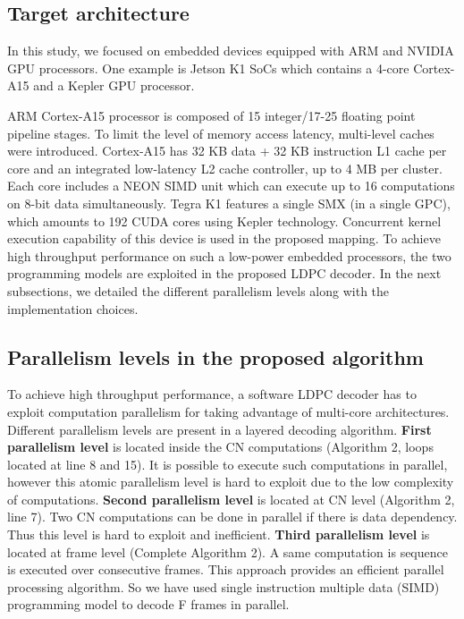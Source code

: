 \documentclass[conference]{IEEEtran}
\begin{document}
\subsection{Target architecture} \label{target_architecture}
In this study, we focused on embedded devices equipped with ARM and NVIDIA GPU processors. One example is Jetson K1 SoCs which contains a 4-core Cortex-A15 and a Kepler GPU processor.

ARM Cortex-A15 processor is composed of 15 integer/17-25 floating point pipeline stages. To limit the level of memory access latency, multi-level caches were introduced. Cortex-A15 has 32 KB data + 32 KB instruction L1 cache per core and an integrated low-latency L2 cache controller, up to 4 MB per cluster. Each core includes a NEON SIMD unit which can execute up to 16 computations on 8-bit data simultaneously. Tegra K1 features a single SMX (in a single GPC), which amounts to 192 CUDA cores using Kepler technology. Concurrent kernel execution capability of this device is used in the proposed mapping. To achieve high throughput performance on such a low-power embedded processors, the two programming models are exploited in the proposed LDPC decoder. In the next subsections, we detailed the different parallelism levels along with the implementation choices.

\subsection{Parallelism levels in the proposed algorithm}
To achieve high throughput performance, a software LDPC decoder has to exploit computation parallelism for taking advantage of multi-core architectures. Different parallelism levels are present in a layered decoding algorithm. \textbf{First parallelism level} is located inside the CN computations (Algorithm 2, loops located at line 8 and 15). It is possible to execute such computations in parallel, however this atomic parallelism level is hard to exploit due to the low complexity of computations. \textbf{Second parallelism level} is located at CN level (Algorithm 2, line 7). Two CN computations can be done in parallel if there is data dependency. Thus this level is hard to exploit and inefficient. \textbf{Third parallelism level} is located at frame level (Complete Algorithm 2). A same computation is sequence is executed over consecutive frames. This approach provides an efficient parallel processing algorithm. So we have used single instruction multiple data (SIMD) programming model to decode F frames in parallel. 
\end{document}
